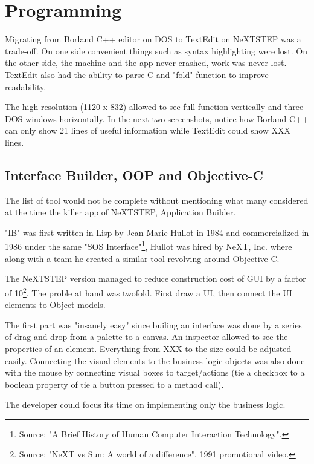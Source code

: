 
\section{Programming}
Migrating from Borland C++ editor on DOS to TextEdit on NeXTSTEP was a trade-off. On one side convenient things such as syntax highlighting were lost. On the other side, the machine and the app never crashed, work was never lost. TextEdit also had the ability to parse C and "fold" function to improve readability.\\
\par
 The high resolution (1120 x 832) allowed to see full function vertically and three DOS windows horizontally. In the next two screenshots, notice how Borland C++ can only show 21 lines of useful information while TextEdit could show XXX lines.\\
\par
{}
\par
{}

\subsection{Interface Builder, OOP and Objective-C}
The list of tool would not be complete without mentioning what many considered at the time the killer app of NeXTSTEP, Application Builder.\\
\par
"IB" was first written in Lisp by Jean Marie Hullot in 1984 and commercialized in 1986 under the same "SOS Interface"\footnote{Source: "A Brief History of Human Computer Interaction Technology".}, Hullot was hired by NeXT, Inc. where along with a team he created a similar tool revolving around Objective-C.\\
\par
The NeXTSTEP version managed to reduce construction cost of GUI by a factor of 10\footnote{Source: "NeXT vs Sun: A world of a difference", 1991 promotional video.}. The proble at hand was twofold. First draw a UI, then connect the UI elements to Object models.\\
\par
The first part was "insanely easy" since builing an interface was done by a series of drag and drop from a palette to a canvas. An inspector allowed to see the properties of an element. Everything from XXX to the size could be adjusted easily. Connecting the visual elements to the business logic objects was also done with the mouse by connecting visual boxes to target/actions (tie a checkbox to a boolean property of tie a button pressed to a method call).\\
\par
The developer could focus its time on implementing only the business logic.
\pagebreak

